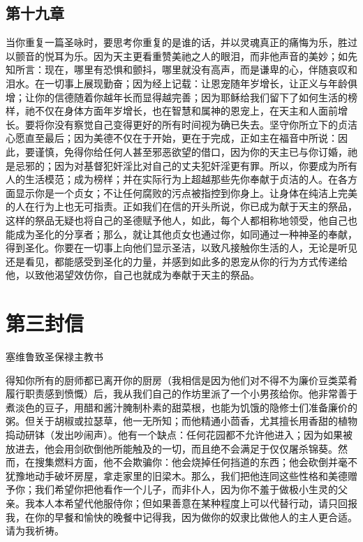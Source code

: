 \subsection{第十九章}

当你重复一篇圣咏时，要思考你重复的是谁的话，并以灵魂真正的痛悔为乐，胜过以颤音的悦耳为乐。因为天主更看重赞美祂之人的眼泪，而非他声音的美妙；如先知所言：现在，哪里有恐惧和颤抖，哪里就没有高声，而是谦卑的心，伴随哀叹和泪水。在一切事上展现勤奋；因为经上记载：让恩宠随年岁增长，让正义与年龄俱增；让你的信德随着你越年长而显得越完善；因为耶稣给我们留下了如何生活的榜样，祂不仅在身体方面年岁增长，也在智慧和属神的恩宠上，在天主和人面前增长。要将你没有察觉自己变得更好的所有时间视为确已失去。坚守你所立下的贞洁心愿直至最后；因为美德不仅在于开始，更在于完成，正如主在福音中所说：因此，要谨慎，免得你给任何人甚至邪恶欲望的借口，因为你的天主已与你订婚，祂是忌邪的；因为对基督犯奸淫比对自己的丈夫犯奸淫更有罪。所以，你要成为所有人的生活模范；成为榜样；并在实际行为上超越那些先你奉献于贞洁的人。在各方面显示你是一个贞女；不让任何腐败的污点被指控到你身上。让身体在纯洁上完美的人在行为上也无可指责。正如我们在信的开头所说，你已成为献于天主的祭品，这样的祭品无疑也将自己的圣德赋予他人，如此，每个人都相称地领受，他自己也能成为圣化的分享者；那么，就让其他贞女也通过你，如同通过一种神圣的奉献，得到圣化。你要在一切事上向他们显示圣洁，以致凡接触你生活的人，无论是听见还是看见，都能感受到圣化的力量，并感到如此多的恩宠从你的行为方式传递给他，以致他渴望效仿你，自己也就成为奉献于天主的祭品。\par


\section{第三封信}

塞维鲁致圣保禄主教书\par

得知你所有的厨师都已离开你的厨房（我相信是因为他们对不得不为廉价豆类菜肴履行职责感到愤慨）后，我从我们自己的作坊里派了一个小男孩给你。他非常善于煮淡色的豆子，用醋和酱汁腌制朴素的甜菜根，也能为饥饿的隐修士们准备廉价的粥。但关于胡椒或拉瑟草，他一无所知；而他精通小茴香，尤其擅长用香甜的植物捣动研钵（发出吵闹声）。他有一个缺点：任何花园都不允许他进入；因为如果被放进去，他会用剑砍倒他所能触及的一切，而且绝不会满足于仅仅屠杀锦葵。然而，在搜集燃料方面，他不会欺骗你：他会烧掉任何挡道的东西；他会砍倒并毫不犹豫地动手破坏房屋，拿走家里的旧梁木。那么，我们把他连同这些性格和美德赠予你；我们希望你把他看作一个儿子，而非仆人，因为你不羞于做极小生灵的父亲。我本人本希望代他服侍你；但如果善意在某种程度上可以代替行动，请只回报我，在你的早餐和愉快的晚餐中记得我，因为做你的奴隶比做他人的主人更合适。请为我祈祷。\par

